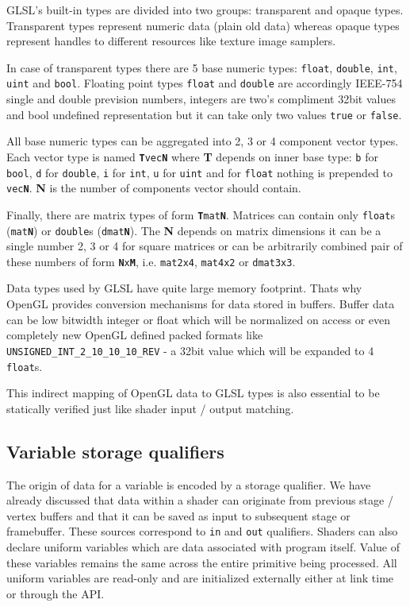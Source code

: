 GLSL's built-in types are divided into two groups: transparent and opaque types.
Transparent types represent numeric data (plain old data) whereas opaque types represent handles to different resources like texture image samplers.

In case of transparent types there are 5 base numeric types: \texttt{float}, \texttt{double}, \texttt{int}, \texttt{uint} and \texttt{bool}.
Floating point types \texttt{float} and \texttt{double} are accordingly IEEE-754 single and double prevision numbers, integers are two's compliment 32bit values and bool undefined representation but it can take only two values \texttt{true} or \texttt{false}.

All base numeric types can be aggregated into 2, 3 or 4 component vector types. Each vector type is named \texttt{\textbf{T}vec\textbf{N}}
where \textbf{T} depends on inner base type: \texttt{b} for \texttt{bool}, \texttt{d} for \texttt{double}, \texttt{i} for \texttt{int}, \texttt{u} for \texttt{uint} and for \texttt{float} nothing is prepended to \texttt{vec\textbf{N}}.
\textbf{N} is the number of components vector should contain.

Finally, there are matrix types of form \texttt{\textbf{T}mat\textbf{N}}. Matrices can contain only \texttt{float}s (\texttt{mat\textbf{N}}) or \texttt{double}s (\texttt{dmat\textbf{N}}).
The \textbf{N} depends on matrix dimensions it can be a single number 2, 3 or 4 for square matrices or can be arbitrarily combined pair of these numbers of form \texttt{\textbf{N}x\textbf{M}},
i.e. \texttt{mat2x4}, \texttt{mat4x2} or \texttt{dmat3x3}.

Data types used by GLSL have quite large memory footprint. Thats why OpenGL provides conversion mechanisms for data stored in buffers. Buffer data can be low bitwidth integer or float which will be normalized on access or even completely new OpenGL defined packed formats like \texttt{UNSIGNED\_INT\_2\_10\_10\_10\_REV} - a 32bit value which will be expanded to 4 \texttt{float}s. 

This indirect mapping of OpenGL data to GLSL types is also essential to be statically verified just like shader input / output matching.

\subsection{Variable storage qualifiers}

The origin of data for a variable is encoded by a storage qualifier. We have already discussed that data within a shader can originate from previous stage / vertex buffers and that it can be saved as input to subsequent stage or framebuffer.
These sources correspond to \texttt{in} and \texttt{out} qualifiers. 
Shaders can also declare uniform variables which are data associated with program itself. Value of these variables remains the same across the
entire primitive being processed. All uniform variables are read-only and are initialized externally either at link time or through the API.

